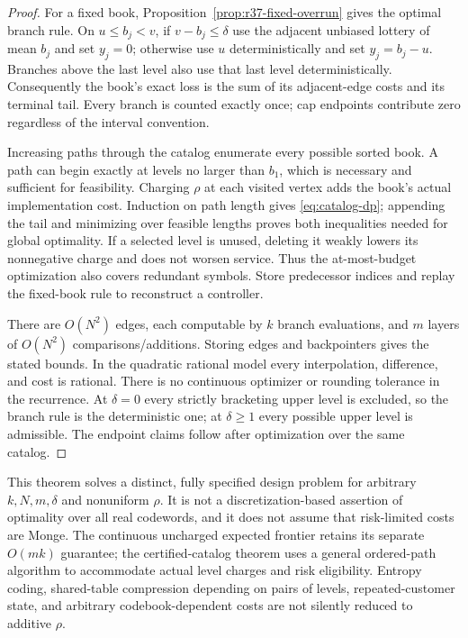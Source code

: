 \begin{proof}
For a fixed book, Proposition~\ref{prop:r37-fixed-overrun} gives the optimal branch rule. On $u\leq b_j<v$, if $v-b_j\leq\delta$ use the adjacent unbiased lottery of mean $b_j$ and set $y_j=0$; otherwise use $u$ deterministically and set $y_j=b_j-u$. Branches above the last level also use that last level deterministically. Consequently the book's exact loss is the sum of its adjacent-edge costs and its terminal tail. Every branch is counted exactly once; cap endpoints contribute zero regardless of the interval convention.

Increasing paths through the catalog enumerate every possible sorted book. A path can begin exactly at levels no larger than $b_1$, which is necessary and sufficient for feasibility. Charging $\rho$ at each visited vertex adds the book's actual implementation cost. Induction on path length gives \eqref{eq:catalog-dp}; appending the tail and minimizing over feasible lengths proves both inequalities needed for global optimality. If a selected level is unused, deleting it weakly lowers its nonnegative charge and does not worsen service. Thus the at-most-budget optimization also covers redundant symbols. Store predecessor indices and replay the fixed-book rule to reconstruct a controller.

There are $O(N^2)$ edges, each computable by $k$ branch evaluations, and $m$ layers of $O(N^2)$ comparisons/additions. Storing edges and backpointers gives the stated bounds. In the quadratic rational model every interpolation, difference, and cost is rational. There is no continuous optimizer or rounding tolerance in the recurrence. At $\delta=0$ every strictly bracketing upper level is excluded, so the branch rule is the deterministic one; at $\delta\geq1$ every possible upper level is admissible. The endpoint claims follow after optimization over the same catalog.
\end{proof}

This theorem solves a distinct, fully specified design problem for arbitrary $k,N,m,\delta$ and nonuniform $\rho$. It is not a discretization-based assertion of optimality over all real codewords, and it does not assume that risk-limited costs are Monge. The continuous uncharged expected frontier retains its separate $O(mk)$ guarantee; the certified-catalog theorem uses a general ordered-path algorithm to accommodate actual level charges and risk eligibility. Entropy coding, shared-table compression depending on pairs of levels, repeated-customer state, and arbitrary codebook-dependent costs are not silently reduced to additive $\rho$.

